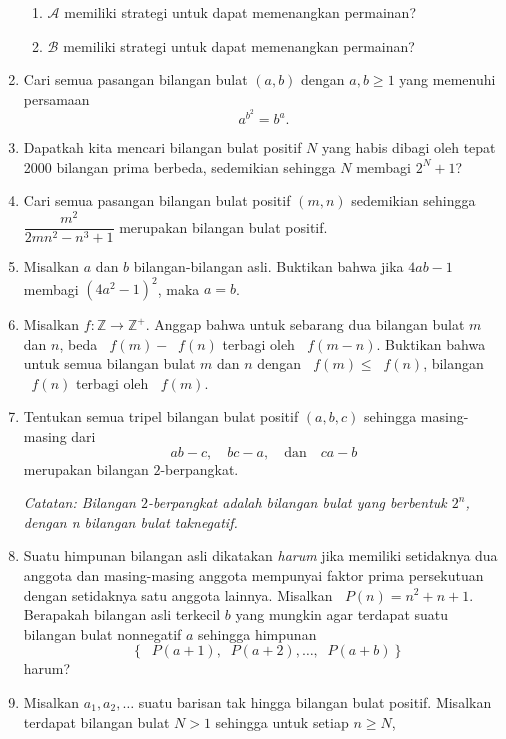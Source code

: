 \documentclass[12pt]{article}
\newcommand*\lrbr[1]{\mathop{}\!\left\lbrace#1\right\rbrace}
\newcommand*\func[2]{\mathop{}\!{#1}{\left({#2}\right)}}
\begin{document}
\begin{enumerate}[leftmargin=*]
		\begin{enumerate}
			\item $ \mathcal{A} $ memiliki strategi untuk dapat memenangkan permainan?
			\item $ \mathcal{B} $ memiliki strategi untuk dapat memenangkan permainan?
		\end{enumerate}
		\item Cari semua pasangan bilangan bulat $ \left(a, b\right) $ dengan $ a, b \geq 1 $ yang memenuhi persamaan
		\[ a^{b^{2}} = b^{a}. \]
		\item Dapatkah kita mencari bilangan bulat positif $ N $ yang habis dibagi oleh tepat 2000 bilangan prima berbeda, sedemikian sehingga $ N $ membagi $ 2^{N} + 1 $?
		\item Cari semua pasangan bilangan bulat positif $ \left(m, n\right) $ sedemikian sehingga $ \dfrac{m^{2}}{2mn^{2} - n^{3} + 1} $ merupakan bilangan bulat positif.
		\item Misalkan $ a $ dan $ b $ bilangan-bilangan asli. Buktikan bahwa jika $ 4ab - 1 $ membagi $ \left(4a^{2} - 1\right)^{2} $, maka $ a = b $.
		\item Misalkan $ f : \mathbb{Z} \to \mathbb{Z}^{+} $. Anggap bahwa untuk sebarang dua bilangan bulat $ m $ dan $ n $, beda $ \func{f}{m} - \func{f}{n} $ terbagi oleh $ \func{f}{m - n} $. Buktikan bahwa untuk semua bilangan bulat $ m $ dan $ n $ dengan $ \func{f}{m} \leq \func{f}{n} $, bilangan $ \func{f}{n} $ terbagi oleh $ \func{f}{m} $.
		\item Tentukan semua tripel bilangan bulat positif $ \left(a, b, c\right) $ sehingga masing-masing dari
		\[ ab - c, \quad bc -a, \quad \mbox{dan} \quad ca - b \]
		merupakan bilangan $ 2 $-berpangkat.
		\par \noindent \textit{Catatan: Bilangan $ 2 $-berpangkat adalah bilangan bulat yang berbentuk $ 2^{n} $, dengan n bilangan bulat taknegatif.}
		\item Suatu himpunan bilangan asli dikatakan \textit{harum} jika memiliki setidaknya dua anggota dan masing-masing anggota mempunyai faktor prima persekutuan dengan setidaknya satu anggota lainnya. Misalkan $ \func{P}{n} = n^{2} + n + 1 $. Berapakah bilangan asli terkecil $ b $ yang mungkin agar terdapat suatu bilangan bulat nonnegatif $ a $ sehingga himpunan
		\[ \lrbr{\func{P}{a + 1}, \func{P}{a + 2}, \dots, \func{P}{a + b}} \]
		harum?
		\item Misalkan $ a_{1}, a_{2}, \dots $ suatu barisan tak hingga bilangan bulat positif. Misalkan terdapat bilangan bulat $ N > 1 $ sehingga untuk setiap $ n \geq N $,

\end{enumerate}
\end{document}
